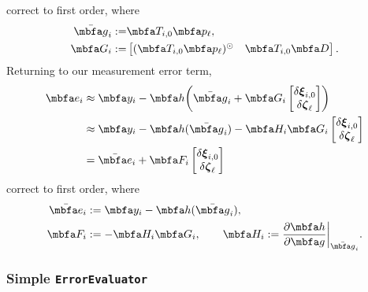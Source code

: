 \documentclass[10pt,letterpaper,fleqn,oneside]{article}
\newcommand{\code}[1]{\texttt{#1}}
\begin{document}
%
correct to first order, where
%
\begin{subequations}
\begin{align}
\mbfbar{g}_i :=&  \mbf{T}_{i,0} \mbf{p}_\ell, \\
\mbf{G}_i :=& \bbm (\mbf{T}_{i,0} \mbf{p}_\ell)^\odot & \mbf{T}_{i,0} \mbf{D} \ebm.
\end{align}
\end{subequations}
%
%
Returning to our measurement error term,
%
\begin{align}
\mbf{e}_i &\approx \mbf{y}_i - \mbf{h} \biggl( \bar{\mbf{g}}_i + \mbf{G}_i \bbm \delta\mbs{\xi}_{i,0} \\ \delta\mbs{\zeta}_\ell \ebm \biggr) \nonumber\\
&\approx \mbf{y}_i - \mbf{h}( \bar{\mbf{g}}_i) - \mbf{H}_i \mbf{G}_i \bbm \delta\mbs{\xi}_{i,0} \\ \delta\mbs{\zeta}_\ell \ebm \nonumber\\
&= \bar{\mbf{e}}_i + \mbf{F}_i \bbm \delta\mbs{\xi}_{i,0} \\ \delta\mbs{\zeta}_\ell \ebm 
\end{align}
%
correct to first order, where
%
\begin{subequations}
	\begin{align}
	\bar{\mbf{e}}_i &:= \mbf{y}_i - \mbf{h}(\bar{\mbf{g}}_i), \\
	\mbf{F}_i &:= -\mbf{H}_i \mbf{G}_i, 
	\quad\quad
	\mbf{H}_i := \dfrac{\partial \mbf{h}}{\partial \mbf{g}} \biggr\rvert_{\bar{\mbf{g}}_i}.
	\end{align}
\end{subequations}
%

\subsubsection{Simple \code{ErrorEvaluator}}
\end{document}

